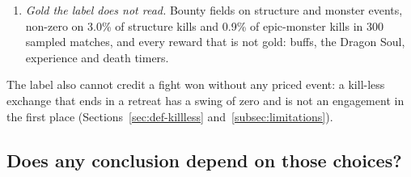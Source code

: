 \begin{enumerate}
  the bounty read at face value rather than at its coefficient. The prices are fitted on matches from
  the same corpus that is later evaluated (Section~\ref{subsec:limitations}).
\item \emph{Gold the label does not read.} Bounty fields on structure and monster events, non-zero on
  3.0\% of structure kills and 0.9\% of epic-monster kills in 300 sampled matches, and every reward that
  is not gold: buffs, the Dragon Soul, experience and death timers.
\end{enumerate}
The label also cannot credit a fight won without any priced event: a kill-less exchange that ends in a
retreat has a swing of zero and is not an engagement in the first place
(Sections~\ref{sec:def-killless} and~\ref{subsec:limitations}).

\subsection{Does any conclusion depend on those choices?}\label{sec:label-family}

